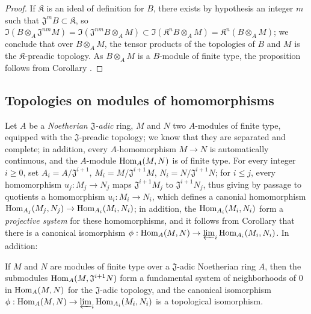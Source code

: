 \begin{proof}
If $\mathfrak{K}$ is an ideal of definition for $B$, there exists by hypothesis an integer $m$ such that $\mathfrak{J}^m B\subset\mathfrak{K}$, so $\Im(B\otimes_A\mathfrak{J}^{nm}M)=\Im(\mathfrak{J}^{nm}B\otimes_A M)\subset\Im(\mathfrak{K}^n B\otimes_A M)=\mathfrak{K}^n(B\otimes_A M)$;
we conclude that over $B\otimes_A M$, the tensor products of the topologies of $B$ and $M$ is the $\mathfrak{K}$-preadic topology.
As $B\otimes_A M$ is a $B$-module of finite type, the proposition follows from Corollary .
\end{proof}

\subsection{Topologies on modules of homomorphisms}
\label{subsection:0.7.8}

\begin{env}[7.8.1]
\label{0.7.8.1}
Let $A$ be a \emph{Noetherian $\mathfrak{J}$-adic} ring, $M$ and $N$ two $A$-modules of finite type,
equipped with the $\mathfrak{J}$-preadic topology; we know  that they are
separated and complete; in addition, every $A$-homomorphism $M\to N$ is automatically continuous, and
the $A$-module ${\mathop{\mathrm{Hom}}\nolimits}_A(M,N)$ is of finite type. For every integer $i\geq 0$, set
$A_i=A/\mathfrak{J}^{i+1}$, $M_i=M/\mathfrak{J}^{i+1}M$, $N_i=N/\mathfrak{J}^{i+1}N$; for
$i\leq j$, every homomorphism $u_j:M_j\to N_j$ maps $\mathfrak{J}^{i+1}M_j$ to
$\mathfrak{J}^{i+1}N_j$, thus giving by passage to quotients a homomorphism $u_i:M_i\to N_i$, which
defines a canonial homomorphism $\Hom_{A_j}(M_j,N_j)\to\Hom_{A_i}(M_i,N_i)$; in addition, the
${\mathop{\mathrm{Hom}}\nolimits}_{A_i}(M_i,N_i)$ form a \emph{projective system} for these homomorphisms, and it follows from
Corollary  that there is a canonical isomorphism
$\vphi:\Hom_A(M,N)\to\varprojlim_i\Hom_{A_i}(M_i,N_i)$.
In addition:
\end{env}

\begin{proposition}[7.8.2]
\label{0.7.8.2}
If $M$ and $N$ are modules of finite type over a $\mathfrak{J}$-adic Noetherian ring $A$, then the
submodules ${\mathop{\mathrm{Hom}}\nolimits}_A(M,\mathfrak{J}^{i+1}N)$ form a fundamental system of neighborhoods of $0$ in
${\mathop{\mathrm{Hom}}\nolimits}_A(M,N)$ for the $\mathfrak{J}$-adic topology, and the canonical isomorphism
$\vphi:\Hom_A(M,N)\to\varprojlim_i\Hom_{A_i}(M_i,N_i)$ is a topological isomorphism.
\end{proposition}

